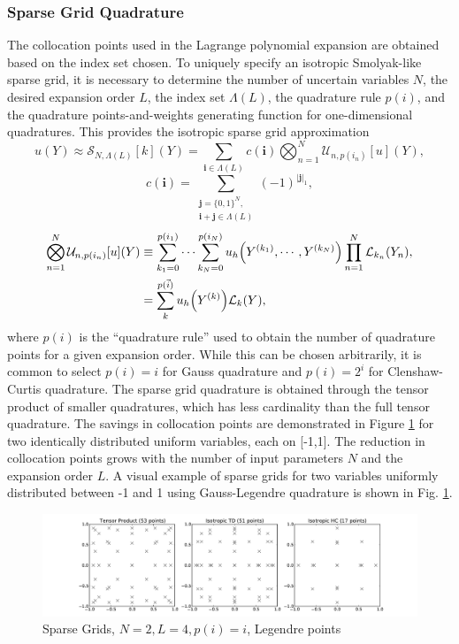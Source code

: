 \documentclass[11pt]{article}
\begin{document}
\subsubsection{Sparse Grid Quadrature}
The collocation points used in the Lagrange polynomial expansion are obtained based on the index set chosen.  To uniquely specify an isotropic Smolyak-like sparse grid, it is necessary to determine the number of uncertain variables $N$, the desired expansion order $L$, the index set $\Lambda(L)$, the quadrature rule $p(i)$, and the quadrature points-and-weights generating function for one-dimensional quadratures.
This provides the isotropic sparse grid approximation
\begin{equation}
u(Y)\approx\mathcal{S}_{N,\Lambda(L)}[k](Y)=\sum_{\boldsymbol{i}\in\Lambda(L)}c(\boldsymbol{i})\bigotimes_{n=1}^N\mathcal{U}_{n,p(i_n)}[u](Y),
\end{equation}
\begin{equation}
c(\boldsymbol{i})=\sum_{\substack{\boldsymbol{j}=\{0,1\}^N,\\ \boldsymbol{i}+\boldsymbol{j}\in\Lambda(L)}}(-1)^{|\boldsymbol{j}|_1},
\end{equation}
\begin{align}
\bigotimes_{n=1}^N\mathcal{U}_{n,p(i_n)}[u](Y)&\equiv\sum_{k_1=0}^{p(i_1)}\cdots\sum_{k_N=0}^{p(i_N)}u_h\qty(Y^{(k_1)},\cdots,Y^{(k_N)})\prod_{n=1}^N \mathcal{L}_{k_n}(Y_n),\\
  &=\sum_{k}^{p(\vec i)}u_h\qty(Y^{(k)})\mathcal{L}_k(Y),
\end{align}
where $p(i)$ is the ``quadrature rule'' used to obtain the number of quadrature points for a given expansion order.  While this can be chosen arbitrarily, it is common to select $p(i)=i$ for Gauss quadrature and $p(i)=2^i$ for Clenshaw-Curtis quadrature.
The sparse grid quadrature is obtained through the tensor product of smaller quadratures, which has less cardinality than the full tensor quadrature.  The savings in collocation points are demonstrated in Figure \ref{collsets} for two identically distributed uniform variables, each on [-1,1].  The reduction in collocation points grows with the number of input parameters $N$ and the expansion order $L$.
A visual example of sparse grids for two variables uniformly distributed between -1 and 1 using Gauss-Legendre quadrature is shown in Fig. \ref{collsets}.
\begin{figure}[H]
\centering
  \includegraphics[width=\linewidth]{sparse_plot}
  \caption{Sparse Grids, $N=2,L=4,p(i)=i$, Legendre points}
  \label{collsets}
\end{figure}
\end{document}
